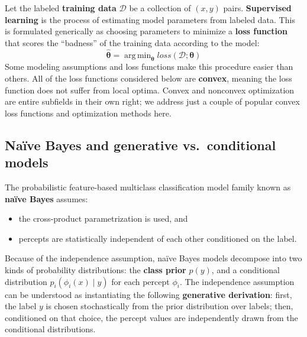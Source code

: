 \documentclass[11pt,letterpaper]{article}
\DeclareMathOperator*{\argmin}{arg\,min}
\begin{document}
Let the labeled \textbf{training data} $\mathcal{D}$ be a collection of $(x,y)$ pairs.
\textbf{Supervised learning} is the process of estimating model parameters from labeled data.
This is formulated generically as choosing parameters to minimize a \textbf{loss function} that scores the 
``badness'' of the training data according to the model:
\begin{equation}
\hat{\boldsymbol{\theta}} = \argmin_{\boldsymbol{\theta}} \textit{loss}(\mathcal{D}; \boldsymbol{\theta})
\end{equation}
Some modeling assumptions and loss functions make this procedure easier than others.
All of the loss functions considered below are \textbf{convex}, 
meaning the loss function does not suffer from local optima.
Convex and nonconvex optimization are entire subfields in their own right; 
we address just a couple of popular convex loss functions and optimization methods here.

\subsection{Na\"{i}ve Bayes and generative vs.~conditional models}\label{sec:naive}

The probabilistic feature-based multiclass classification model family known as \textbf{na\"{i}ve Bayes} assumes:
\begin{itemize}
  \item the cross-product parametrization is used, and
  \item percepts are statistically independent of each other conditioned on the label.
\end{itemize}

Because of the independence assumption, na\"{i}ve Bayes models decompose into two kinds of probability distributions:
the \textbf{class prior} $p(y)$, and a conditional distribution $p_i(\phi_i(x) \mid y)$ for each percept $\phi_i$.
The independence assumption can be understood as instantiating the following \textbf{generative derivation}:
first, the label $y$ is chosen stochastically from the prior distribution over labels; 
then, conditioned on that choice, the percept values are independently drawn from the conditional distributions.
\end{document}
